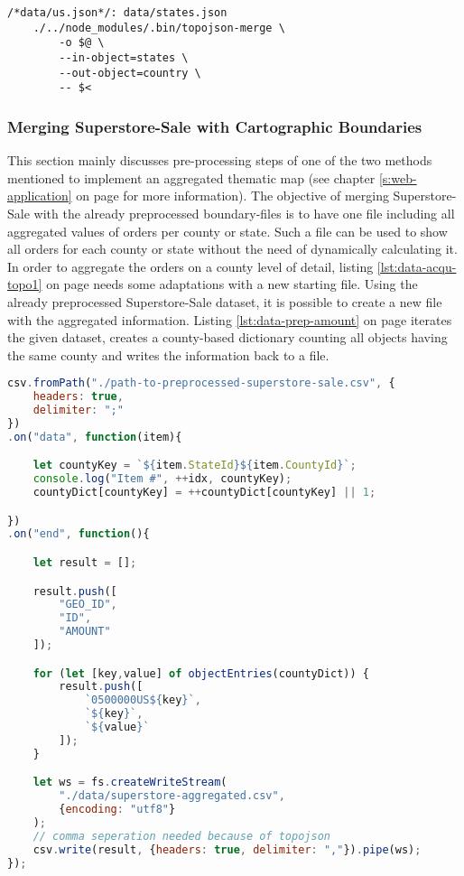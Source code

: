 \begin{lstlisting}[style={makefile}, caption={Make task for converting state boundaries to a county boundary}, label={lst:data-acqu-topo3}]
/*data/us.json*/: data/states.json
    ./../node_modules/.bin/topojson-merge \
        -o $@ \
        --in-object=states \
        --out-object=country \
        -- $<
\end{lstlisting}

\subsubsection{Merging Superstore-Sale with Cartographic Boundaries}
This section mainly discusses pre-processing steps of one of the two methods mentioned to implement an aggregated thematic map (see chapter \ref{s:web-application} on page \pageref{s:web-application} for more information). The objective of merging Superstore-Sale with the already preprocessed boundary-files is to have one file including all aggregated values of orders per county or state. Such a file can be used to show all orders for each county or state without the need of dynamically calculating it.
In order to aggregate the orders on a county level of detail, listing \ref{lst:data-acqu-topo1} on page \pageref{lst:data-acqu-topo1} needs some adaptations with a new starting file. Using the already preprocessed Superstore-Sale dataset, it is possible to create a new file with the aggregated information. Listing \ref{lst:data-prep-amount} on page \pageref{lst:data-prep-amount} iterates the given dataset, creates a county-based dictionary counting all objects having the same county and writes the information back to a file.

\begin{lstlisting}[language=JavaScript, caption={Creating the file containing aggregation information}, label={lst:data-prep-amount}]
csv.fromPath("./path-to-preprocessed-superstore-sale.csv", {
    headers: true,
    delimiter: ";"
})
.on("data", function(item){

    let countyKey = `${item.StateId}${item.CountyId}`;
    console.log("Item #", ++idx, countyKey);
    countyDict[countyKey] = ++countyDict[countyKey] || 1;

})
.on("end", function(){

    let result = [];

    result.push([
        "GEO_ID",
        "ID",
        "AMOUNT"
    ]);

    for (let [key,value] of objectEntries(countyDict)) {
        result.push([
            `0500000US${key}`,
            `${key}`,
            `${value}`
        ]);
    }

    let ws = fs.createWriteStream(
        "./data/superstore-aggregated.csv",
        {encoding: "utf8"}
    );
    // comma seperation needed because of topojson
    csv.write(result, {headers: true, delimiter: ","}).pipe(ws);
});
\end{lstlisting}

